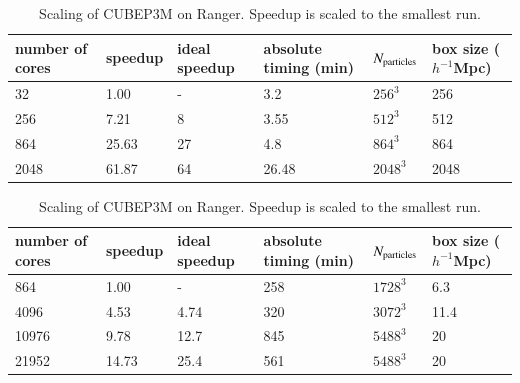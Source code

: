 \begin{table}%
  \vskip -0.5cm 
  \begin{center}
\caption{Scaling of {\small CUBEP3M} on Curie. Speedup is 
scaled to the smallest run.}
\label{summary_scaling_table}
\begin{tabular}{@{}|llllll|}
\hline
number of cores & speedup & ideal speedup & absolute timing (min) & 
$N_{\rm particles}$& box size ($h^{-1}$Mpc)
\\[2mm]\hline
32  &  1.00 & - &3.2 & $256^3$ & 256\\
256  & 7.21 & 8 &3.55 & $512^3$  & 512\\
864  & 25.63 & 27 &4.8 & $864^3$  & 864\\
2048  & 61.87 & 64 &26.48 & $2048^3$ & 2048 \\
\hline
\end{tabular}
\caption{Scaling of  {\small CUBEP3M} on Ranger. Speedup is scaled to the smallest run.}
\label{summary_scaling_table2}
\begin{tabular}{@{}|llllll|}
\hline
number of cores & speedup & ideal speedup & absolute timing (min) & 
$N_{\rm particles}$& box size ($h^{-1}$Mpc)
\\[2mm]\hline
864    & 1.00  & -    &258   & $1728^3$  & 6.3\\
4096   & 4.53  & 4.74 &320   & $3072^3$  & 11.4\\
10976  & 9.78  & 12.7 &845   & $5488^3$  & 20\\
21952  & 14.73 & 25.4 &561   & $5488^3$  & 20 \\
\hline
\end{tabular}
\end{center}
  \vskip -0.7cm 
\end{table}


